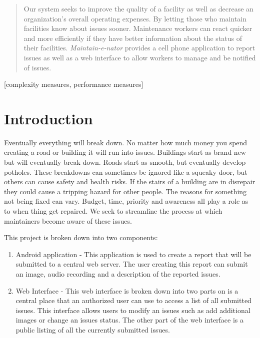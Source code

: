 \documentclass{acm_proc_article-sp}
\begin{document}
\maketitle

\begin{abstract}
Our system seeks to improve the quality of a facility as well as decrease an organization's overall operating expenses.  By letting those who maintain facilities know about issues sooner. Maintenance workers can react quicker and more efficiently if they have better information about the status of their facilities.  \textit{Maintain-e-nator} provides a cell phone application to report issues as well as a web interface to allow workers to manage and be notified of issues.
\end{abstract}

[complexity measures, performance measures]


\section{Introduction}
Eventually everything will break down. No matter how much money you spend creating a road or building it will run into issues. Buildings start as brand new but will eventually break down.  Roads start as smooth, but eventually develop potholes.  These breakdowns can sometimes be ignored like a squeaky door, but others can cause safety and health risks. If the stairs of a building are in disrepair they could cause a tripping hazard for other people. The reasons for something not being fixed can vary. Budget, time, priority and awareness all play a role as to when thing get repaired. We seek to streamline the process at which maintainers become aware of these issues.

This project is broken down into two components:
\vspace{-4mm}
\begin{enumerate}[itemsep=0mm]
\item Android application - This application is used to create a report that will be submitted to a central web server. The user creating this report can submit an image, audio recording and a description of the reported issues.
\item Web Interface - This web interface is broken down into two parts on is a central place that an authorized user can use to access a list of all submitted issues. This interface allows users to modify an issues such as add additional images or change an issues status. The other part of the web interface is a public listing of all the currently submitted issues.
\end{enumerate}
\end{document}
